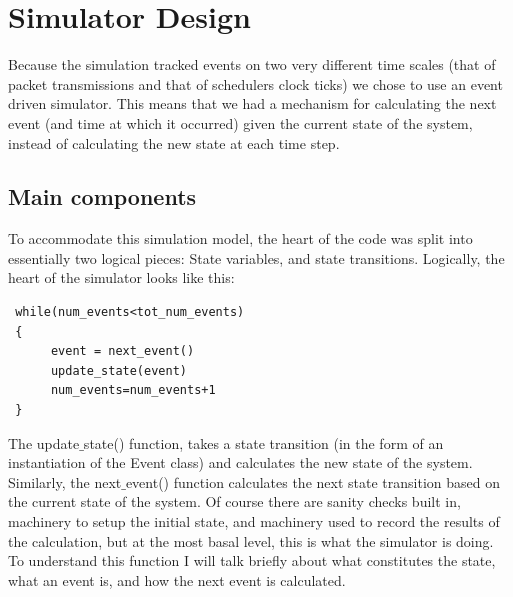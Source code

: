 \documentclass[11pt]{article}%
\begin{document}

\label{bib}
{}
 
 \newpage
\appendix
 \section{Simulator Design} \label{code_design}
 
 Because the simulation tracked events on two very different time scales (that of packet transmissions and that of schedulers clock ticks) we chose to use an event driven simulator.  This means that we had a mechanism for calculating the next event (and time at which it occurred) given the current state of the system, instead of calculating the new state at each time step.
 
 \subsection{Main components}
 To accommodate this simulation model, the heart of the code was split into essentially two logical pieces: State variables, and state transitions.  Logically, the heart of the simulator looks like this:
 \begin{verbatim}
 while(num_events<tot_num_events)
 {
      event = next_event()
      update_state(event)
      num_events=num_events+1
 }
 \end{verbatim}
 The update$\_$state() function, takes a state transition (in the form of an instantiation of the Event class) and calculates the new state of the system.  Similarly, the next$\_$event() function calculates the next state transition based on the current state of the system.  Of course there are sanity checks built in, machinery to setup the initial state, and machinery used to record the results of the calculation, but at the most basal level, this is what the simulator is doing.  To understand this function I will talk briefly about what constitutes the state, what an event is, and how the next event is calculated.
 
\end{document}
